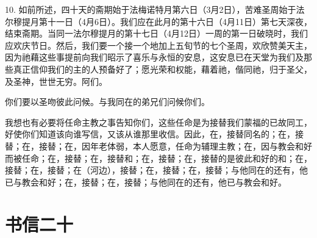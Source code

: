 10. 如前所述，四十天的斋期始于法梅诺特月第六日（3月2日），苦难圣周始于法尔穆提月第十一日（4月6日）。我们应在此月的第十六日（4月11日）第七天深夜，结束斋期。当同一法尔穆提月的第十七日（4月12日）一周的第一日破晓时，我们应欢庆节日。然后，我们要一个接一个地加上五旬节的七个圣周，欢欣赞美天主，因为祂藉这些事提前向我们昭示了喜乐与永恒的安息，这安息已在天堂为我们及那些真正信仰我们的主的人预备好了；愿光荣和权能，藉着祂，偕同祂，归于圣父，及圣神，世世无穷。阿们。\par

你们要以圣吻彼此问候。与我同在的弟兄们问候你们。\par

我想也有必要将任命主教之事告知你们，这些任命是为接替我们蒙福的已故同工，好使你们知道该向谁写信，又该从谁那里收信。因此，在，接替同名的；在，接替；在，接替；在，因年老体弱，本人愿意，任命为辅理主教；在，因与教会和好而被任命；在，接替；在，接替和；在，接替；在，接替的是彼此和好的和；在，接替；在，接替；在（河边），接替；在，接替；在，接替；与他同在的还有，他已与教会和好；在，接替；在，接替；与他同在的还有，他已与教会和好。\par



\section{书信二十}

